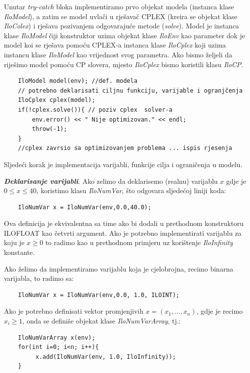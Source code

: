 \documentclass[a4paper, utf8, 11pt, colorlinks]{article}
\begin{document}
 \noindent Unutar \emph{try-catch} bloka implementiramo prvo objekat modela (instanca klase \emph{IloModel}), a zatim se model uvlači u rješavač CPLEX (kreira se objekat klase \emph{IloColex}) i rješava pozivanjem odgovarajuće metode (\emph{solve}).
 Model je instanca klase \emph{IloModel} čiji konstruktor uzima objekat klase \emph{IloEnv} kao parameter dok je model koi se rješava pomoću CPLEX-a instanca klase \emph{IloCplex} koji uzima instancu klase \emph{IloModel} kao vrijednost svog parametra.  Ako bismo željeli da riješimo model pomoću CP slovera, mjesto \emph{IloCplex} bismo koristili klasu \emph{IloCP}. 
 

 \begin{verbatim}
 	IloModel model(env); //def. modela
 	// potrebno deklarisati ciljnu funkciju, varijable i ogranjčenja
 	IloCplex cplex(model);
 	if(!cplex.solve()){ // poziv cplex  solver-a
 		env.error() << " Nije optimizovan." << endl;
 		throw(-1);
 	}
 	//cplex zavrsio sa optimizovanjem problema ... ispis rjesenja
 \end{verbatim}
 
 \noindent Sljedeći korak je implementacija varijabli, funkcije cilja i ograničenja u modelu. 
 
 \noindent \textbf{\emph{Deklarisanje varijabli}}. Ako zelimo da deklarisemo (realnu) varijablu $x$ gdje je $0 \leq x \leq 40$, koristimo klasu \emph{IloNumVar}, što odgovara sljedećoj liniji koda:
 \begin{verbatim}
 	IloNumVar x = IloNumVar(env,0.0,40.0);
 \end{verbatim}
 Ova definicija je ekvivalentna sa time ako bi dodali u prethodnom konstruktoru ILOFLOAT kao četvrti argument. 
Ako je potrebno implementirati varijablu za koju je $x \geq 0$ to radimo kao u prethodnom primjeru uz korištenje  \emph{IloInfinity} konstante.
 
 Ako želimo da implementiramo varijablu koja je cjelobrojna, recimo binarna varijabla, to radimo sa:
 \begin{verbatim}
 	IloNumVar x = IloNumVar(env,0.0, 1.0, ILOINT);
 \end{verbatim}
 
 \noindent Ako je potrebno definisati vektor promjenjivih $x=(x_1,...,x_n)$, gdje je recimo $x_i \geq 1$, onda se definiše objekat klase \emph{IloNumVarArray}, tj.:
 \begin{verbatim}
 	IloNumVarArray x(env);
 	for(int i=0; i<n; i++){
 		 x.add(IloNumVar(env, 1.0, IloInfinity));
 	}
 \end{verbatim}
 
\end{document}
